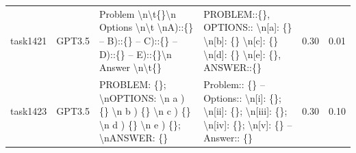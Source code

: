 \begin{longtable}{@{}p{0.8cm\tiny}p{1cm\tiny}p{4.1cm\ttfamily\tiny}p{4.1cm\ttfamily\tiny}p{0.8cm\tiny}p{0.8cm\tiny}@{}}
task1421  & GPT3.5    & Problem \textbackslash{}n\textbackslash{}t\{\}\textbackslash{}n Options \textbackslash{}n\textbackslash{}t \textbackslash{}nA)::\{\} -- B)::\{\} -- C)::\{\} -- D)::\{\} -- E)::\{\}\textbackslash{}n Answer \textbackslash{}n\textbackslash{}t\{\}                                                                                                                                                                                                                                                                     & PROBLEM::\{\}, OPTIONS:: \textbackslash{}n{[}a{]}: \{\} \textbackslash{}n{[}b{]}: \{\} \textbackslash{}n{[}c{]}: \{\} \textbackslash{}n{[}d{]}: \{\} \textbackslash{}n{[}e{]}: \{\}, ANSWER::\{\}                                                                                                                                                                                                                                                                                                                                                                                 & 0.30 & 0.01 \\
task1423  & GPT3.5    & PROBLEM: \{\}; \textbackslash{}nOPTIONS:  \textbackslash{}n a ) \{\} \textbackslash{}n b ) \{\} \textbackslash{}n c ) \{\} \textbackslash{}n d ) \{\} \textbackslash{}n e ) \{\}; \textbackslash{}nANSWER: \{\}                                                                                                                                                                                                                                                                                                         & Problem:: \{\} -- Options::  \textbackslash{}n{[}i{]}: \{\}; \textbackslash{}n{[}ii{]}: \{\}; \textbackslash{}n{[}iii{]}: \{\}; \textbackslash{}n{[}iv{]}: \{\}; \textbackslash{}n{[}v{]}: \{\} -- Answer:: \{\}                                                                                                                                                                                                                                                                                                                                                                  & 0.30 & 0.10 \\

\end{longtable}
